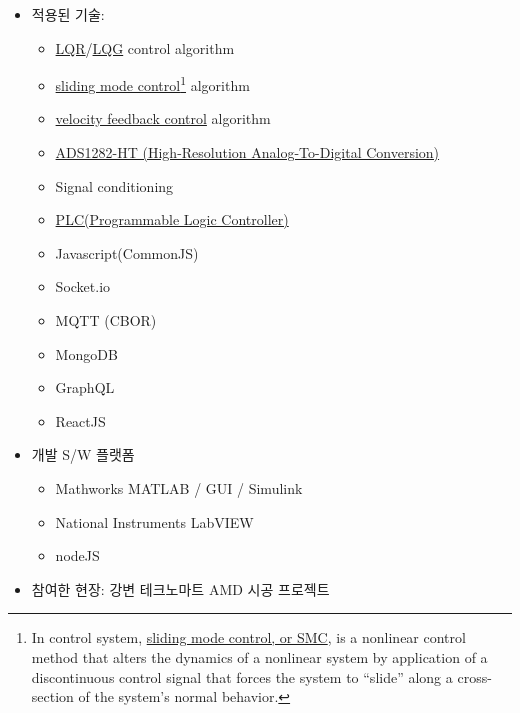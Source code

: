 \documentclass[10pt,a4paper,ragged2e]{altacv}
\begin{document}
\begin{fullwidth}
\begin{itemize}
		\item
		      적용된 기술:
		      \begin{itemize}
			      \item \href{https://en.wikipedia.org/wiki/Linear-quadratic_regulator}{LQR}/\href{https://en.wikipedia.org/wiki/Linear-quadratic-Gaussian_control}{LQG} control algorithm
			      \item \href{https://en.wikipedia.org/wiki/Sliding_mode_control}{sliding mode control}\footnote{In control system,  \href{https://en.wikipedia.org/wiki/Sliding_mode_control}{sliding mode control, or SMC}, is a nonlinear control method that alters the dynamics of a nonlinear system by application of a discontinuous control signal that forces the system to ``slide'' along a cross-section of the system's normal behavior.} algorithm
			      \item \href{https://en.wikipedia.org/wiki/Minor_loop_feedback}{velocity feedback control} algorithm
			      \item \href{http://www.ti.com/lit/ds/symlink/ads1282-ht.pdf}{ADS1282-HT (High-Resolution Analog-To-Digital Conversion)}
			      \item Signal conditioning
			      \item \href{https://en.wikipedia.org/wiki/Programmable_logic_controller}{PLC(Programmable Logic Controller)}
			      \item Javascript(CommonJS)
			      \item Socket.io
			      \item MQTT (CBOR)
			      \item MongoDB
			      \item GraphQL
			      \item ReactJS
		      \end{itemize}
		\item 개발 S/W 플랫폼
		      \begin{itemize}
			      \item Mathworks MATLAB / GUI / Simulink
			      \item National Instruments LabVIEW
			      \item nodeJS
		      \end{itemize}
		\item 참여한 현장: 강변 테크노마트 AMD 시공 프로젝트
	\end{itemize}

	\divider



\end{fullwidth}
\end{document}
